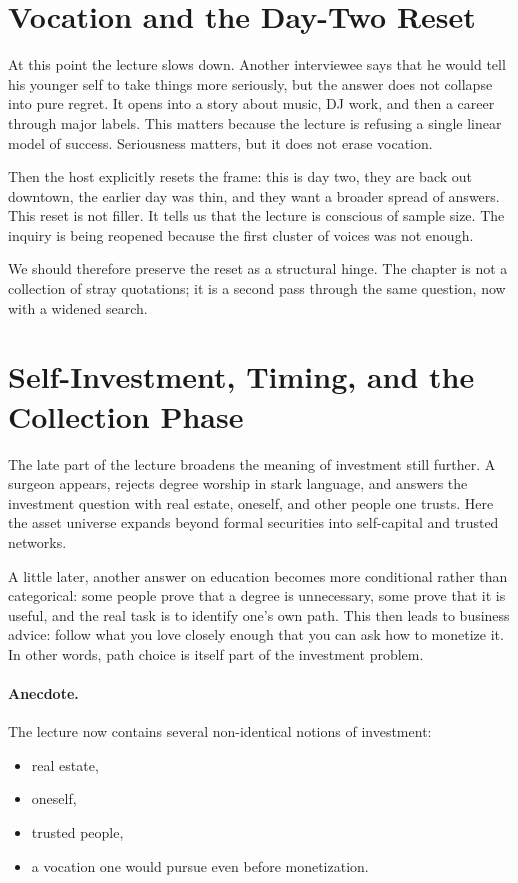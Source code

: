 \section{Vocation and the Day-Two Reset}

At this point the lecture slows down. Another interviewee says that he would tell his younger self to take things more seriously, but the answer does not collapse into pure regret. It opens into a story about music, DJ work, and then a career through major labels. This matters because the lecture is refusing a single linear model of success. Seriousness matters, but it does not erase vocation.

Then the host explicitly resets the frame: this is day two, they are back out downtown, the earlier day was thin, and they want a broader spread of answers. This reset is not filler. It tells us that the lecture is conscious of sample size. The inquiry is being reopened because the first cluster of voices was not enough.

We should therefore preserve the reset as a structural hinge. The chapter is not a collection of stray quotations; it is a second pass through the same question, now with a widened search.

\section{Self-Investment, Timing, and the Collection Phase}

The late part of the lecture broadens the meaning of investment still further. A surgeon appears, rejects degree worship in stark language, and answers the investment question with real estate, oneself, and other people one trusts. Here the asset universe expands beyond formal securities into self-capital and trusted networks.

A little later, another answer on education becomes more conditional rather than categorical: some people prove that a degree is unnecessary, some prove that it is useful, and the real task is to identify one's own path. This then leads to business advice: follow what you love closely enough that you can ask how to monetize it. In other words, path choice is itself part of the investment problem.

\paragraph{Anecdote.}
The lecture now contains several non-identical notions of investment:
\begin{itemize}
\item real estate,
\item oneself,
\item trusted people,
\item a vocation one would pursue even before monetization.
\end{itemize}

